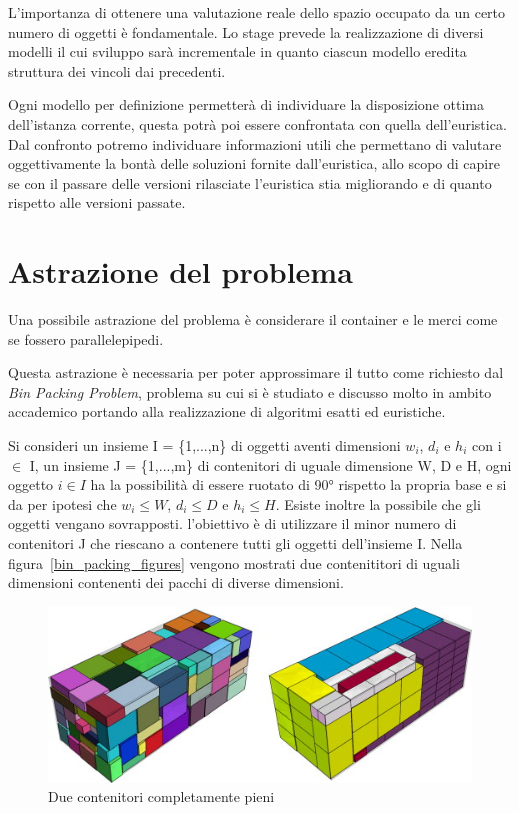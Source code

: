 L'importanza di ottenere una valutazione reale dello spazio occupato da un certo numero di oggetti è fondamentale. Lo stage prevede la realizzazione di diversi modelli il cui sviluppo sarà incrementale in quanto ciascun modello eredita struttura dei vincoli dai precedenti.

Ogni modello per definizione permetterà di individuare la disposizione ottima dell'istanza corrente, questa potrà poi essere confrontata con quella dell'euristica. Dal confronto potremo individuare informazioni utili che permettano di valutare oggettivamente la bontà delle soluzioni fornite dall'euristica, allo scopo di capire se con il passare delle versioni rilasciate l'euristica stia migliorando e di quanto rispetto alle versioni passate.

\section{Astrazione del problema}
Una possibile astrazione del problema è considerare il container e le merci come se fossero parallelepipedi.

Questa astrazione è necessaria per poter approssimare il tutto come richiesto dal \textit{Bin Packing Problem}, problema su cui si è studiato e discusso molto in ambito accademico portando alla realizzazione di algoritmi esatti ed euristiche.

Si consideri un insieme I = \{1,...,n\} di oggetti aventi dimensioni $w_{i}$, $d_{i}$ e $h_{i}$ con i $\in$ I, un insieme J = \{1,...,m\} di contenitori di uguale dimensione W, D e H, ogni oggetto $i \in I$ ha la possibilità di essere ruotato di 90° rispetto la propria base e si da per ipotesi che $w_{i} \leq W$, $d_{i} \leq D$ e $h_{i} \leq H$. Esiste inoltre la possibile che gli oggetti vengano sovrapposti. l'obiettivo è di utilizzare il minor numero di contenitori J che riescano a contenere tutti gli oggetti dell'insieme I. Nella figura~\eqref{bin_packing_figures} vengono mostrati due contenititori di uguali dimensioni contenenti dei pacchi di diverse dimensioni.
\begin{figure}[H]
	\begin{center} \includegraphics[scale=0.8]{figures/bin_packing}
		\caption[Contenitori Bin Packing]{Due contenitori completamente pieni}  
		\label{bin_packing_figures}
	\end{center}
\end{figure}

